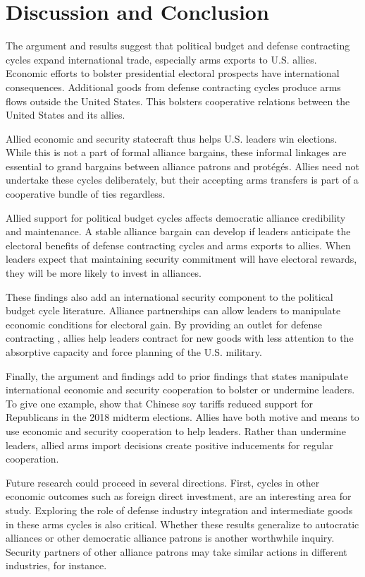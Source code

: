 \documentclass[12pt]{article}
\begin{document}
\section{Discussion and Conclusion}


The argument and results suggest that political budget and defense contracting cycles expand international trade, especially arms exports to U.S. allies. 
Economic efforts to bolster presidential electoral prospects have international consequences. 
Additional goods from defense contracting cycles produce arms flows outside the United States.
This bolsters cooperative relations between the United States and its allies.


Allied economic and security statecraft thus helps U.S. leaders win elections. 
While this is not a part of formal alliance bargains, these informal linkages are essential to grand bargains between alliance patrons and prot{\'e}g{\'e}s.
Allies need not undertake these cycles deliberately, but their accepting arms transfers is part of a cooperative bundle of ties regardless.


Allied support for political budget cycles affects democratic alliance credibility and maintenance. 
A stable alliance bargain can develop if leaders anticipate the electoral benefits of defense contracting cycles and arms exports to allies.
When leaders expect that maintaining security commitment will have electoral rewards, they will be more likely to invest in alliances. 


These findings also add an international security component to the political budget cycle literature.
Alliance partnerships can allow leaders to manipulate economic conditions for electoral gain. 
By providing an outlet for defense contracting , allies help leaders contract for new goods with less attention to the absorptive capacity and force planning of the U.S. military.


Finally, the argument and findings add to prior findings that states manipulate international economic and security cooperation to bolster or undermine leaders. 
To give one example, \citet{ChyzhUrbatsch2021} show that Chinese soy tariffs reduced support for Republicans in the 2018 midterm elections. 
Allies have both motive and means to use economic and security cooperation to help leaders. 
Rather than undermine leaders, allied arms import decisions create positive inducements for regular cooperation.


Future research could proceed in several directions. 
First, cycles in other economic outcomes such as foreign direct investment, are an interesting area for study. 
Exploring the role of defense industry integration and intermediate goods in these arms cycles is also critical.
Whether these results generalize to autocratic alliances or other democratic alliance patrons is another worthwhile inquiry. 
Security partners of other alliance patrons may take similar actions in different industries, for instance.
\end{document}
